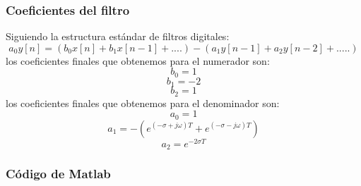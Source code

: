 \documentclass[titlepage]{article}
\begin{document}
\subsubsection{Coeficientes del filtro}
Siguiendo la estructura estándar de filtros digitales:
\begin{equation}
a_0y[n]=(b_0x[n]+b_1x[n-1]+ ....)-(a_1y[n-1] + a_2y[n-2] + .....)  
\end{equation}
los coeficientes finales que obtenemos para el numerador son:
\begin{equation}
b_0=1
\end{equation}
\begin{equation}
b_1=-2
\end{equation}
\begin{equation}
b_2=1
\end{equation}
los coeficientes finales que obtenemos para el denominador son:
\begin{equation}
a_0=1 
\end{equation}
\begin{equation}
a_1=-(e^{(-\sigma+j\omega)T}+e^{(-\sigma-j\omega)T})
\end{equation}
\begin{equation}
a_2=e^{-2{\sigma}T}
\end{equation}


\subsubsection{Código de Matlab}

\end{document}
